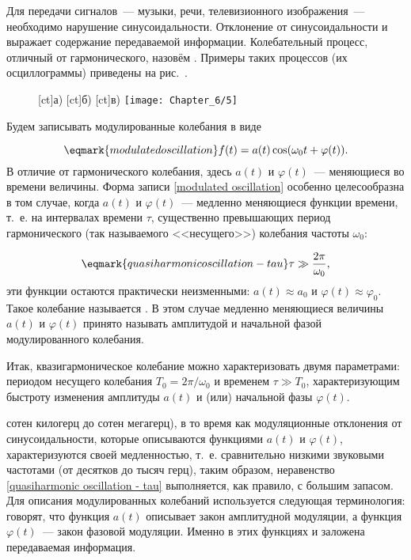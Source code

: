 Для передачи сигналов~--- музыки, речи, телевизионного изображения~---
необходимо нарушение синусоидальности. Отклонение
от синусоидальности и выражает содержание передаваемой информации. Колебательный
процесс, отличный от гармонического,
назовём . Примеры таких процессов (их
осциллограммы) приведены на рис.~.

\begin{figure}[h!]
    [ct]{а)}
    [ct]{б)}
    [ct]{в)}
    \texttt{[image: Chapter\_6/5]}
    \caption{}
\end{figure}

Будем записывать модулированные колебания в виде

\begin{equation}
    \eqmark{modulated oscillation}
    f(t)=a(t)\cos(\omega_0t+\varphi(t)).
\end{equation}
В отличие от гармонического колебания, здесь $a(t)$ и $\varphi(t)$~---
меняющиеся во времени величины. Форма записи \eqref{modulated oscillation}
особенно целесообразна в том случае, когда $a(t)$ и $\varphi(t)$~--- медленно
меняющиеся функции времени, т.~е. на
интервалах времени $\tau$, существенно превышающих период гармонического (так
называемого <<несущего>>) колебания
частоты $\omega_0$:

\begin{equation}
    \eqmark{quasiharmonic oscillation - tau}
    \tau \gg \frac{2\pi}{\omega_0},
\end{equation}
эти функции остаются практически неизменными: $a(t)\approx a_{0}$ и
$\varphi(t)\approx\varphi_0$. Такое колебание называется
. В этом случае медленно меняющиеся величины
$a(t)$ и $\varphi(t)$ принято называть амплитудой и
начальной фазой модулированного колебания.

Итак, квазигармоническое колебание можно характеризовать двумя параметрами:
периодом несущего колебания
$T_0=2\pi/\omega_0$ и временем $\tau \gg T_0$, характеризующим быстроту
изменения амплитуды $a(t)$ и (или) начальной
фазы $\varphi(t)$.

сотен килогерц до сотен мегагерц), в то время как модуляционные отклонения от
синусоидальности, которые описываются функциями $a(t)$ и $\varphi(t)$,
характеризуются своей медленностью, т.~е. сравнительно низкими звуковыми
частотами (от десятков до тысяч герц), таким образом, неравенство
\eqref{quasiharmonic oscillation - tau} выполняется, как правило, с большим
запасом.
%
Для описания модулированных колебаний используется
следующая терминология: говорят, что функция $a(t)$ описывает закон амплитудной
модуляции, а функция $\varphi(t)$~--- закон
фазовой модуляции. Именно в этих функциях и заложена передаваемая информация.

